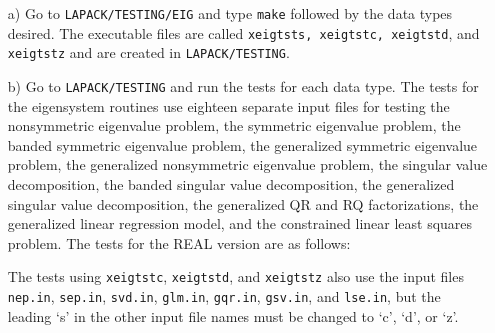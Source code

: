 \documentclass[11pt]{report}
\begin{document}
\begin{itemize}

\item[a)]
Go to \texttt{LAPACK/TESTING/EIG} and type \texttt{make} followed by the data types
desired.  The executable files are called \texttt{xeigtsts,
xeigtstc, xeigtstd}, and \texttt{xeigtstz} and are created
in \texttt{LAPACK/TESTING}.

\item[b)]
Go to \texttt{LAPACK/TESTING} and run the tests for each data type.
The tests for the eigensystem routines use eighteen separate input files
for testing the nonsymmetric eigenvalue problem,
the symmetric eigenvalue problem, the banded symmetric eigenvalue
problem, the generalized symmetric eigenvalue
problem, the generalized nonsymmetric eigenvalue problem, the
singular value decomposition, the banded singular value decomposition,
the generalized singular value
decomposition, the generalized QR and RQ factorizations, the generalized
linear regression model, and the constrained linear least squares
problem.
The tests for the REAL version are as follows:
The tests using \texttt{xeigtstc}, \texttt{xeigtstd}, and \texttt{xeigtstz} also
use the input files \texttt{nep.in}, \texttt{sep.in}, \texttt{svd.in},
\texttt{glm.in}, \texttt{gqr.in}, \texttt{gsv.in}, and \texttt{lse.in},
but the leading `s' in the other input file names must be changed
to `c', `d', or `z'.
\end{itemize}
\end{document}
